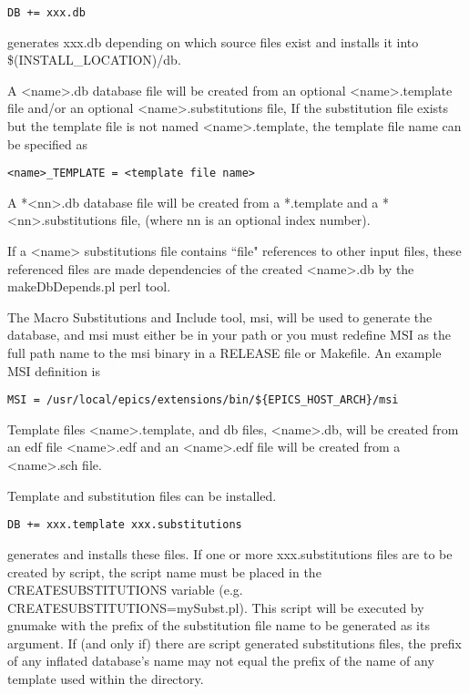 \begin{verbatim}DB += xxx.db
\end{verbatim}generates xxx.db depending on which source files exist and installs it into \$(INSTALL\_LOCATION)/db.

A \textless{}name\textgreater{}.db database file will be created from an optional \textless{}name\textgreater{}.template file and/or an optional 
\textless{}name\textgreater{}.substitutions file, If the substitution file exists but the template file is not named \textless{}name\textgreater{}.template, the template 
file name can be specified as

\begin{verbatim}<name>_TEMPLATE = <template file name>
\end{verbatim}A *\textless{}nn\textgreater{}.db database file will be created from a *.template and a *\textless{}nn\textgreater{}.substitutions file, (where nn is an optional index 
number).

If a \textless{}name\textgreater{} substitutions file contains ``file" references to other input files, these referenced files are  made dependencies 
of the created \textless{}name\textgreater{}.db by the makeDbDepends.pl perl tool.

The Macro Substitutions and Include tool, msi, will be used to generate the database, and msi must either be in your path 
or you must redefine MSI as the full path name to the msi binary in a RELEASE file or Makefile. An example MSI 
definition is

\begin{verbatim}MSI = /usr/local/epics/extensions/bin/${EPICS_HOST_ARCH}/msi
\end{verbatim}
Template files \textless{}name\textgreater{}.template, and db files, \textless{}name\textgreater{}.db, will be created from an edf file \textless{}name\textgreater{}.edf and an 
\textless{}name\textgreater{}.edf file will be created from a \textless{}name\textgreater{}.sch file.

Template and substitution files can be installed.

\begin{verbatim}DB += xxx.template xxx.substitutions
\end{verbatim}
generates and installs these files. If one or more xxx.substitutions files are to be created by script, the script name must be 
placed in the CREATESUBSTITUTIONS variable (e.g. CREATESUBSTITUTIONS=mySubst.pl). This script will be 
executed by gnumake with the prefix of the substitution file name to be generated as its argument. If (and only if) there 
are script generated substitutions files, the prefix of any inflated database's name may not equal the prefix of the name of 
any template used within the directory.

